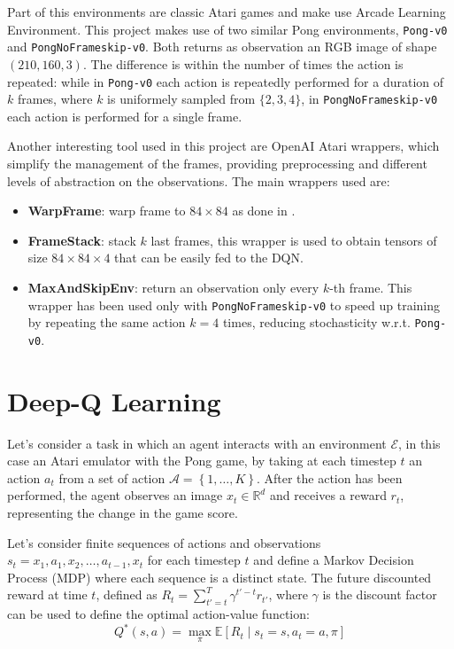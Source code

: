 \documentclass[a4paper]{article}
\numberwithin{equation}{section} %
\numberwithin{figure}{section} %
\numberwithin{table}{section} %
\theoremstyle{definition}
\begin{document}
Part of this environments are classic Atari games and make use Arcade Learning
Environment. This project makes use of two similar Pong environments,
\texttt{Pong-v0} and \texttt{PongNoFrameskip-v0}. Both returns as observation
an RGB image of shape $(210, 160, 3)$. The difference is within the number of times
the action is repeated: while in \texttt{Pong-v0} each action is repeatedly
performed for a duration of $k$ frames, where $k$ is uniformely sampled from
$\{ 2, 3, 4 \}$, in \texttt{PongNoFrameskip-v0} each action is performed for
a single frame.

Another interesting tool used in this project are OpenAI Atari
wrappers\cite{openai-gym-baselines}, which simplify the management of the frames,
providing preprocessing and different levels of abstraction on the observations.
The main wrappers used are:
\begin{itemize}
	\item \textbf{WarpFrame}: warp frame to $84 \times 84$ as done in \cite{mnih2015humanlevel}.
	\item \textbf{FrameStack}: stack $k$ last frames, this wrapper is used to
		obtain tensors of size $84 \times 84 \times 4$ that can be easily fed to the DQN.
	\item \textbf{MaxAndSkipEnv}: return an observation only every $k$-th frame. This wrapper has
		been used only with \texttt{PongNoFrameskip-v0} to speed up training by repeating
		the same action $k=4$ times, reducing stochasticity w.r.t. \texttt{Pong-v0}.
\end{itemize}


\section{Deep-Q Learning}

Let's consider a task in which an agent interacts with an environment $\mathcal{E}$,
in this case an Atari emulator with the Pong game, by taking at each timestep $t$
an action $a_t$ from a set of action $ \mathcal{A} = \left\{ 1, \dots, K \right\} $.
After the action has been performed, the agent observes
an image $x_t \in \mathbb{R}^d$ and receives a reward $r_t$, representing the
change in the game score.

Let's consider finite sequences of actions and observations $s_t = x_1, a_1, x_2, \dots,
a_{t-1}, x_t$ for each timestep $t$ and define a Markov Decision Process (MDP) where
each sequence is a distinct state. The future discounted reward
at time $t$, defined as $R_t = \sum_{t'=t}^{T} \gamma^{t'-t} r_{t'}$, where $\gamma$ is the
discount factor can be used to define the optimal action-value function:
\begin{equation*}
	Q^*(s, a) = \max_\pi \mathbb{E} \left[ R_t \mid s_t = s, a_t = a, \pi \right]
\end{equation*}
\end{document}
